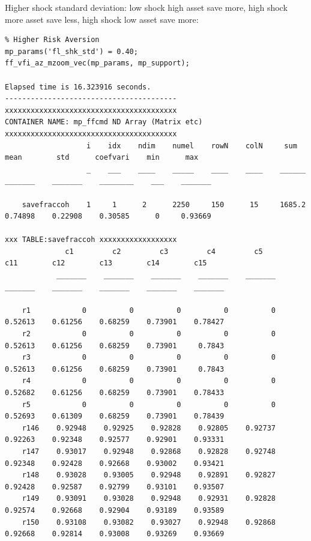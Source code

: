 \documentclass[
]{book}
\begin{document}
Higher shock standard deviation: low shock high asset save more, high
shock more asset save less, high shock low asset save more:

\begin{verbatim}
% Higher Risk Aversion
mp_params('fl_shk_std') = 0.40;
ff_vfi_az_mzoom_vec(mp_params, mp_support);

Elapsed time is 16.323916 seconds.
----------------------------------------
xxxxxxxxxxxxxxxxxxxxxxxxxxxxxxxxxxxxxxxx
CONTAINER NAME: mp_ffcmd ND Array (Matrix etc)
xxxxxxxxxxxxxxxxxxxxxxxxxxxxxxxxxxxxxxxx
                   i    idx    ndim    numel    rowN    colN     sum       mean        std      coefvari    min      max  
                   _    ___    ____    _____    ____    ____    ______    _______    _______    ________    ___    _______

    savefraccoh    1     1      2      2250     150      15     1685.2    0.74898    0.22908    0.30585      0     0.93669

xxx TABLE:savefraccoh xxxxxxxxxxxxxxxxxx
              c1         c2         c3         c4         c5         c11        c12        c13        c14        c15  
            _______    _______    _______    _______    _______    _______    _______    _______    _______    _______

    r1            0          0          0          0          0    0.52613    0.61256    0.68259    0.73901    0.78427
    r2            0          0          0          0          0    0.52613    0.61256    0.68259    0.73901     0.7843
    r3            0          0          0          0          0    0.52613    0.61256    0.68259    0.73901     0.7843
    r4            0          0          0          0          0    0.52682    0.61256    0.68259    0.73901    0.78433
    r5            0          0          0          0          0    0.52693    0.61309    0.68259    0.73901    0.78439
    r146    0.92948    0.92925    0.92828    0.92805    0.92737    0.92263    0.92348    0.92577    0.92901    0.93331
    r147    0.93017    0.92948    0.92868    0.92828    0.92748    0.92348    0.92428    0.92668    0.93002    0.93421
    r148    0.93028    0.93005    0.92948    0.92891    0.92827    0.92428    0.92587    0.92799    0.93101    0.93507
    r149    0.93091    0.93028    0.92948    0.92931    0.92828    0.92574    0.92668    0.92904    0.93189    0.93589
    r150    0.93108    0.93082    0.93027    0.92948    0.92868    0.92668    0.92814    0.93008    0.93269    0.93669
\end{verbatim}
\end{document}
